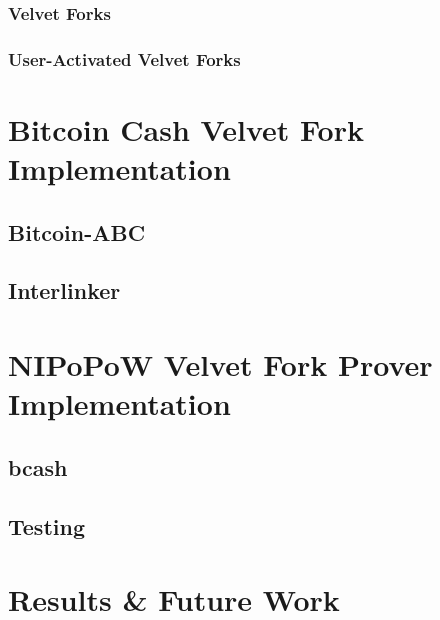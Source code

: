 \documentclass[11pt]{llncs}
\begin{document}
\subsubsection{Velvet Forks}
\subsubsection{User-Activated Velvet Forks}

\section{Bitcoin Cash Velvet Fork Implementation}

\subsection{Bitcoin-ABC}
\subsection{Interlinker}

\section{NIPoPoW Velvet Fork Prover Implementation}

\subsection{bcash}
\subsection{Testing}

\section{Results \& Future Work}


\end{document}
